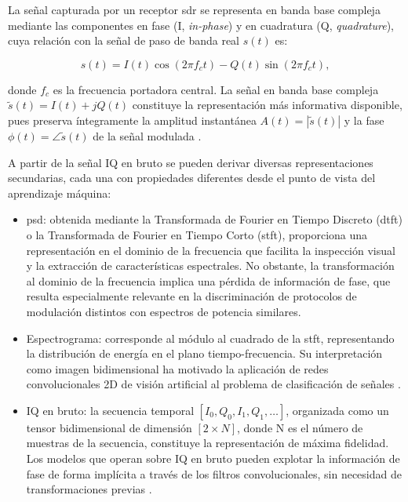 La señal capturada por un receptor \gls{sdr} se representa en banda base compleja mediante las componentes en fase (I, \textit{in-phase}) y en cuadratura (Q, \textit{quadrature}), cuya relación con la señal de paso de banda real $s(t)$ es:

\begin{equation}
  s(t) = I(t)\cos(2\pi f_c t) - Q(t)\sin(2\pi f_c t),
\end{equation}

donde $f_c$ es la frecuencia portadora central. La señal en banda base compleja $\tilde{s}(t) = I(t) + jQ(t)$ constituye la representación más informativa disponible, pues preserva íntegramente la amplitud instantánea $A(t) = |\tilde{s}(t)|$ y la fase $\phi(t) = \angle\tilde{s}(t)$ de la señal modulada \cite{oppenheim_discrete_2014, valkama_blind_2005}.

A partir de la señal IQ en bruto se pueden derivar diversas representaciones secundarias, cada una con propiedades diferentes desde el punto de vista del aprendizaje máquina:

\begin{itemize}
  \item \gls{psd}: obtenida mediante la
  Transformada de Fourier en Tiempo Discreto (\gls{dtft}) o la Transformada de Fourier en Tiempo Corto (\gls{stft}), proporciona una representación en el dominio de la frecuencia que facilita la inspección visual y la extracción de características espectrales. No obstante, la transformación al dominio de la frecuencia implica una pérdida de información de fase, que resulta especialmente relevante en la discriminación de protocolos de modulación distintos con espectros de potencia similares.

  \item Espectrograma: corresponde al módulo al cuadrado de la \gls{stft},
  representando la distribución de energía en el plano tiempo-frecuencia. Su interpretación como imagen bidimensional ha motivado la aplicación de redes convolucionales 2D de visión artificial al problema de clasificación de señales \cite{gluge_robust_2024}.

  \item IQ en bruto: la secuencia temporal $[I_0, Q_0, I_1, Q_1, \ldots]$,
  organizada como un tensor bidimensional de dimensión $[2 \times N]$, donde N es el número de muestras de la secuencia, constituye la representación de máxima fidelidad. Los modelos que operan sobre IQ en bruto pueden explotar la información de fase de forma implícita a través de los filtros convolucionales, sin necesidad de transformaciones previas \cite{zheng_deep_2025}.
\end{itemize}

